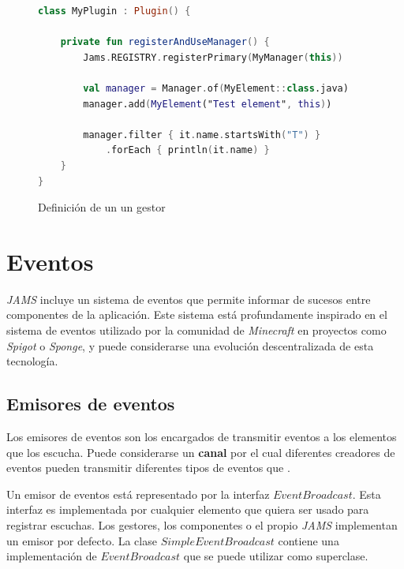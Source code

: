 \begin{figure}[h]
    \centering
    \begin{lstlisting}[frame=single,label={lst:manager-use},language=Kotlin]
class MyPlugin : Plugin() {

    private fun registerAndUseManager() {
        Jams.REGISTRY.registerPrimary(MyManager(this))

        val manager = Manager.of(MyElement::class.java)
        manager.add(MyElement("Test element", this))

        manager.filter { it.name.startsWith("T") }
            .forEach { println(it.name) }
    }
}
    \end{lstlisting}
    \caption{Definición de un un gestor}
    \label{fig:manager-use}
\end{figure}


\section{Eventos}\label{sec:eventos}

\textit{JAMS} incluye un sistema de eventos que permite informar
de sucesos entre componentes de la aplicación.
Este sistema está profundamente inspirado en el sistema de eventos
utilizado por la comunidad de \textit{Minecraft}
en proyectos como \textit{Spigot}\cite{SPIGOT}
o \textit{Sponge}\cite{SPONGE}, y puede considerarse una evolución descentralizada
de esta tecnología.

\subsection{Emisores de eventos}\label{subsec:emisores-de-eventos}

Los emisores de eventos son los encargados de transmitir
eventos a los elementos que los escucha.
Puede considerarse un \textbf{canal} por el cual diferentes creadores
de eventos pueden transmitir diferentes tipos de eventos
que .

 Un emisor de eventos está representado por la interfaz $EventBroadcast$.
Esta interfaz es implementada por cualquier elemento que quiera ser
usado para registrar escuchas.
Los gestores, los componentes o el propio \textit{JAMS} implementan
un emisor por defecto.
La clase $SimpleEventBroadcast$ contiene una implementación de $EventBroadcast$
que se puede utilizar como superclase.

